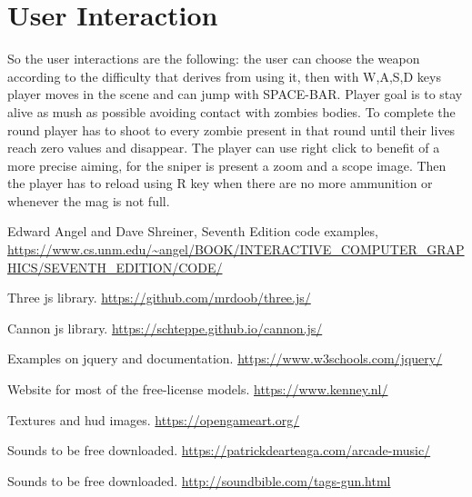 \documentclass[14pt]{extarticle}
\begin{document}
\section {User Interaction}

So the user interactions are the following: the user can choose the weapon according to the difficulty that derives from using it, then with W,A,S,D keys player moves in the scene and can jump with SPACE-BAR. Player goal is to stay alive as mush as possible avoiding contact with zombies bodies. To complete the round player has to shoot to every zombie present in that round until their lives reach zero values and disappear. The player can use right click to benefit of a more precise aiming, for the sniper is present a zoom and a scope image.
Then the player has to reload using R key when there are no more ammunition or whenever the mag is not full.   



%
%
%



\begin{thebibliography}{9}


Edward Angel and Dave Shreiner, Seventh Edition code examples,
\url{https://www.cs.unm.edu/~angel/BOOK/INTERACTIVE_COMPUTER_GRAPHICS/SEVENTH_EDITION/CODE/} 
 
Three js library.
\url{https://github.com/mrdoob/three.js/}


Cannon js library. \url{https://schteppe.github.io/cannon.js/}

 Examples on jquery and documentation. \url{https://www.w3schools.com/jquery/}

Website for most of the free-license models. \url{https://www.kenney.nl/}

Textures and hud images. \url{ https://opengameart.org/ }


Sounds to be free downloaded. \url{   https://patrickdearteaga.com/arcade-music/ }

Sounds to be free downloaded. 
\url{http://soundbible.com/tags-gun.html}


\end{thebibliography}
\end{document}
